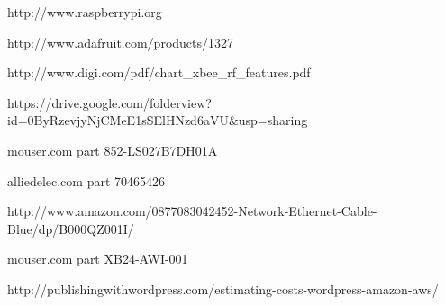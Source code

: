 \documentclass[PPFS.tex]{template/subfiles}
\begin{document}
\begin{thebibliography}{}
http://www.raspberrypi.org

http://www.adafruit.com/products/1327

http://www.digi.com/pdf/chart\_xbee\_rf\_features.pdf

https://drive.google.com/folderview?id=0ByRzevjyNjCMeE1sSElHNzd6aVU\&usp=sharing

mouser.com part 852-LS027B7DH01A

alliedelec.com part 70465426 

http://www.amazon.com/0877083042452-Network-Ethernet-Cable-Blue/dp/B000QZ001I/

mouser.com part XB24-AWI-001

http://publishingwithwordpress.com/estimating-costs-wordpress-amazon-aws/

\end{thebibliography}
\end{document}
